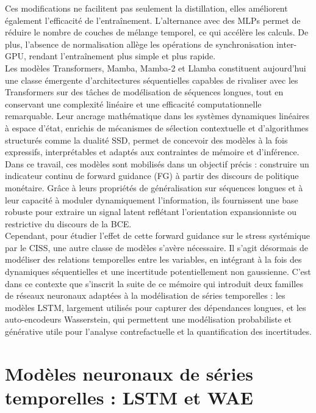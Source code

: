 Ces modifications ne facilitent pas seulement la distillation, elles améliorent également l'efficacité de l'entraînement. L'alternance avec des MLPs permet de réduire le nombre de couches de mélange temporel, ce qui accélère les calculs. De plus, l’absence de normalisation allège les opérations de synchronisation inter-GPU, rendant l’entraînement plus simple et plus rapide.\\

Les modèles Transformers, Mamba, Mamba-2 et Llamba constituent aujourd’hui une classe émergente d’architectures séquentielles capables de rivaliser avec les Transformers sur des tâches de modélisation de séquences longues, tout en conservant une complexité linéaire et une efficacité computationnelle remarquable. Leur ancrage mathématique dans les systèmes dynamiques linéaires à espace d’état, enrichis de mécanismes de sélection contextuelle et d’algorithmes structurés comme la dualité SSD, permet de concevoir des modèles à la fois expressifs, interprétables et adaptés aux contraintes de mémoire et d'inférence. Dans ce travail, ces modèles sont mobilisés dans un objectif précis : construire un indicateur continu de forward guidance (FG) à partir des discours de politique monétaire. Grâce à leurs propriétés de généralisation sur séquences longues et à leur capacité à moduler dynamiquement l’information, ils fournissent une base robuste pour extraire un signal latent reflétant l’orientation expansionniste ou restrictive du discours de la BCE.\\

Cependant, pour étudier l’effet de cette forward guidance sur le stress systémique par le CISS, une autre classe de modèles s’avère nécessaire. Il s’agit désormais de modéliser des relations temporelles entre les variables, en intégrant à la fois des dynamiques séquentielles et une incertitude potentiellement non gaussienne. C’est dans ce contexte que s’inscrit la suite de ce mémoire qui introduit deux familles de réseaux neuronaux adaptées à la modélisation de séries temporelles : les modèles LSTM, largement utilisés pour capturer des dépendances longues, et les auto-encodeurs Wasserstein, qui permettent une modélisation probabiliste et générative utile pour l’analyse contrefactuelle et la quantification des incertitudes.

\section{Modèles neuronaux de séries temporelles : LSTM et WAE}


